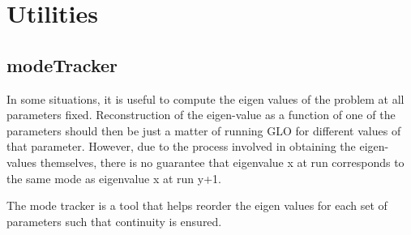 \documentclass[a4paper,10pt]{book}
\begin{document}
\appendix

\chapter{Utilities}
\section{modeTracker}
\label{util:modeTracker}
In some situations, it is useful to compute the eigen values of the problem at
all parameters fixed. Reconstruction of the eigen-value as a function of one of
the parameters should then be just a matter of running GLO for different values
of that parameter. However, due to the process involved in obtaining the
eigen-values themselves, there is no guarantee that eigenvalue x at run
corresponds to the same mode as eigenvalue x at run y+1.

The mode tracker is a tool that helps reorder the eigen values for each set of
parameters such that continuity is ensured.



\end{document}
